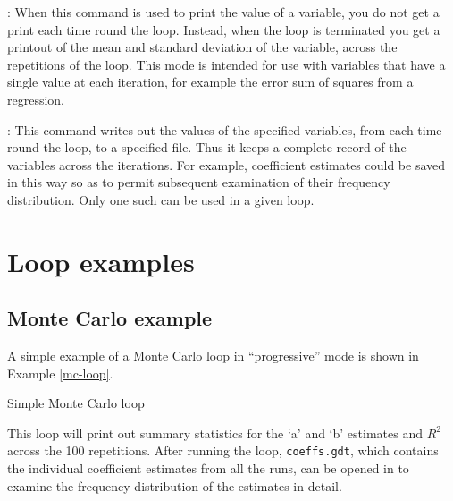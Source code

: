 : When this command is used to print the value of a
variable, you do not get a print each time round the loop.  Instead,
when the loop is terminated you get a printout of the mean and
standard deviation of the variable, across the repetitions of the
loop.  This mode is intended for use with variables that have a single
value at each iteration, for example the error sum of squares from a
regression.

: This command writes out the values of the specified
variables, from each time round the loop, to a specified file.  Thus
it keeps a complete record of the variables across the iterations.
For example, coefficient estimates could be saved in this way so as to
permit subsequent examination of their frequency distribution. Only
one such  can be used in a given loop.

\section{Loop examples}
\label{loop-examples}


\subsection{Monte Carlo example}
\label{loop-mc-example}

A simple example of a Monte Carlo loop in ``progressive'' mode is
shown in Example \ref{mc-loop}.

\begin{script}[htbp]
  \caption{Simple Monte Carlo loop}
  \label{mc-loop}
\end{script}

This loop will print out summary statistics for the `a' and `b'
estimates and $R^2$ across the 100 repetitions.  After running the
loop, \verb+coeffs.gdt+, which contains the individual coefficient
estimates from all the runs, can be opened in  to examine
the frequency distribution of the estimates in detail.

